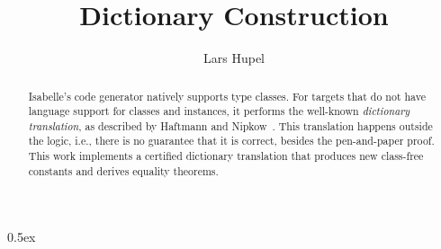 \documentclass[11pt,a4paper]{article}
\begin{document}
\title{Dictionary Construction}
\author{Lars Hupel}
\maketitle

\parindent 0pt\parskip 0.5ex

\begin{abstract}
  Isabelle's code generator natively supports type classes.
  For targets that do not have language support for classes and instances, it performs
  the well-known \emph{dictionary translation}, as described by Haftmann and
  Nipkow~\cite{haftmann2010codegeneration}.
  This translation happens outside the logic, i.e., there is no guarantee that it is correct,
  besides the pen-and-paper proof.
  This work implements a certified dictionary translation that produces new class-free constants and
  derives equality theorems.
\end{abstract}

\tableofcontents





\end{document}
